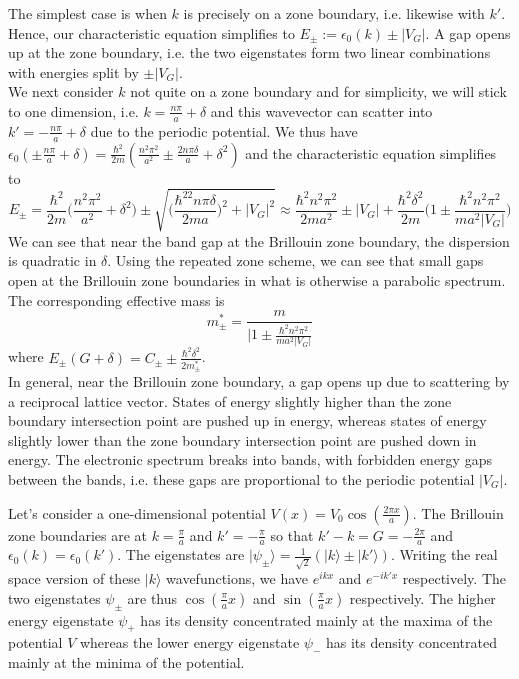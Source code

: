 \documentclass[a4paper]{article}
\begin{document}
\begin{Note}
The simplest case is when $k$ is precisely on a zone boundary, i.e. likewise with $k'$. Hence, our characteristic equation simplifies to $E_{\pm}:=\epsilon_0(k)\pm|V_G|$. A gap opens up at the zone boundary, i.e. the two eigenstates form two linear combinations with energies split by $\pm|V_G|$.\\[5pt]
We next consider $k$ not quite on a zone boundary and for simplicity, we will stick to one dimension, i.e. $k=\frac{n\pi}{a}+\delta$ and this wavevector can scatter into $k'=-\frac{n\pi}{a}+\delta$ due to the periodic potential. We thus have $\epsilon_0(\pm\frac{n\pi}{a}+\delta)=\frac{\hbar^2}{2m}(\frac{n^2\pi^2}{a^2}\pm\frac{2n\pi\delta}{a}+\delta^2)$ and the characteristic equation simplifies to
$$E_{\pm}=\frac{\hbar^2}{2m}\bigg(\frac{n^2\pi^2}{a^2}+\delta^2\bigg)\pm\sqrt{\bigg(\frac{\hbar^22n\pi\delta}{2ma}\bigg)^2+|V_G|^2}\approx\frac{\hbar^2n^2\pi^2}{2ma^2}\pm|V_G|+\frac{\hbar^2\delta^2}{2m}\bigg(1\pm\frac{\hbar^2n^2\pi^2}{ma^2|V_G|}\bigg)$$
We can see that near the band gap at the Brillouin zone boundary, the dispersion is quadratic in $\delta$. Using the repeated zone scheme, we can see that small gaps open at the Brillouin zone boundaries in what is otherwise a parabolic spectrum. The corresponding effective mass is
$$m_{\pm}^*=\frac{m}{|1\pm\frac{\hbar^2n^2\pi^2}{ma^2|V_G|}}$$
where $E_{\pm}(G+\delta)=C_{\pm}\pm\frac{\hbar^2\delta^2}{2m^*_{\pm}}$.\\[5pt]
In general, near the Brillouin zone boundary, a gap opens up due to scattering by a reciprocal lattice vector. States of energy slightly higher than the zone boundary intersection point are pushed up in energy, whereas states of energy slightly lower than the zone boundary intersection point are pushed down in energy. The electronic spectrum breaks into bands, with forbidden energy gaps between the bands, i.e. these gaps are proportional to the periodic potential $|V_G|$.
\end{Note}
\begin{eg}[1D]
Let's consider a one-dimensional potential $V(x)=V_0\cos(\frac{2\pi x}{a})$. The Brillouin zone boundaries are at $k=\frac{\pi}{a}$ and $k'=-\frac{\pi}{a}$ so that $k'-k=G=-\frac{2\pi}{a}$ and $\epsilon_0(k)=\epsilon_0(k')$. The eigenstates are $|\psi_{\pm}\rangle=\frac{1}{\sqrt{2}}(|k\rangle\pm|k'\rangle)$. Writing the real space version of these $|k\rangle$ wavefunctions, we have $e^{ikx}$ and $e^{-ik'x}$ respectively. The two eigenstates $\psi_{\pm}$ are thus $\cos(\frac{\pi}{a}x)$ and $\sin(\frac{\pi}{a}x)$ respectively. The higher energy eigenstate $\psi_+$ has its density concentrated mainly at the maxima of the potential $V$ whereas the lower energy eigenstate $\psi_-$ has its density concentrated mainly at the minima of the potential.
\end{eg}
\end{document}

